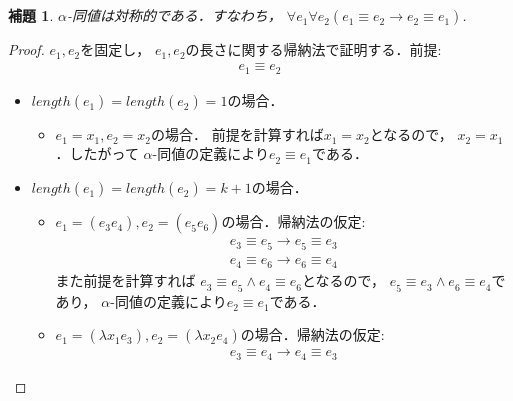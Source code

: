 \documentclass{ltjsbook}%
\newtheorem{lemma}{補題}[section]%
\begin{document}
\begin{lemma}%
  $\alpha$-同値は対称的である．すなわち，%
  $\forall\mathit{e}_1^{}\forall\mathit{e}_2^{}%
  (\mathit{e}_1^{}\equiv \mathit{e}_2^{}\rightarrow\mathit{e}_2^{}\equiv \mathit{e}_1^{})$.%
\end{lemma}%
\begin{proof}%
  $\mathit{e}_1^{},\mathit{e}_2^{}$を固定し，%
  $\mathit{e}_1^{},\mathit{e}_2^{}$の長さに関する帰納法で証明する．前提:%
  \begin{align}%
    \mathit{e}_1^{}\equiv \mathit{e}_2^{}%
  \end{align}%
  \begin{itemize}%
  \item $length(\mathit{e}_1^{})=length(\mathit{e}_2^{})=1$の場合．%
  \begin{itemize}%
  \item $\mathit{e}_1^{}=\mathit{x}_1^{},\mathit{e}_2^{}=\mathit{x}_2^{}$の場合．%
    前提を計算すれば$\mathit{x}_1^{}=\mathit{x}_2^{}$となるので，%
    $\mathit{x}_2^{}=\mathit{x}_1^{}$．したがって%
    $\alpha$-同値の定義により$\mathit{e}_2^{}\equiv \mathit{e}_1^{}$である．%
  \end{itemize}%
  \item $length(\mathit{e}_1^{})=length(\mathit{e}_2^{})=k+1$の場合．%
  \begin{itemize}%
  \item $\mathit{e}_1^{}=(\mathit{e}_3^{}\mathit{e}_4^{}),%
    \mathit{e}_2^{}=(\mathit{e}_5^{}\mathit{e}_6^{})$の場合．帰納法の仮定:%
    \begin{align}%
    \mathit{e}_3^{}\equiv\mathit{e}_5^{}\rightarrow%
    \mathit{e}_5^{}\equiv\mathit{e}_3^{}\\%
    \mathit{e}_4^{}\equiv\mathit{e}_6^{}\rightarrow%
    \mathit{e}_6^{}\equiv\mathit{e}_4^{}%
    \end{align}%
    また前提を計算すれば%
    $\mathit{e}_3^{}\equiv\mathit{e}_5^{}\land\mathit{e}_4^{}\equiv\mathit{e}_6^{}$となるので，%
    $\mathit{e}_5^{}\equiv\mathit{e}_3^{}\land\mathit{e}_6^{}\equiv\mathit{e}_4^{}$であり，%
    $\alpha$-同値の定義により$\mathit{e}_2^{}\equiv \mathit{e}_1^{}$である．%
  \item $\mathit{e}_1^{}=(\lambda \mathit{x}_1^{}\mathit{e}_3^{}),%
    \mathit{e}_2^{}=(\lambda \mathit{x}_2^{}\mathit{e}_4^{})$の場合．帰納法の仮定:%
    \begin{align}%
    \mathit{e}_3^{}\equiv\mathit{e}_4^{}\rightarrow%
    \mathit{e}_4^{}\equiv\mathit{e}_3^{}%
    \end{align}%

\end{itemize}
\end{itemize}
\end{proof}
\end{document}
